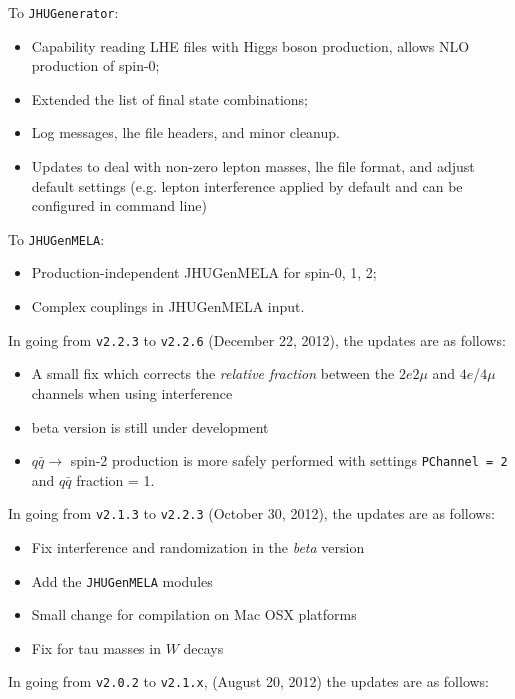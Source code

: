 \documentclass[aps,superscriptaddress,nofootinbib]{revtex4}
\begin{document}
To \verb|JHUGenerator|:
\begin{itemize}
\item Capability reading LHE files with Higgs boson production, allows NLO production of spin-0;
\item Extended the list of final state combinations;
\item Log messages, lhe file headers, and minor cleanup.
\item Updates to deal with non-zero lepton masses, lhe file format, and adjust default settings (e.g. lepton interference applied by default and can be configured in command line)
\end{itemize}

To \verb|JHUGenMELA|:
\begin{itemize}
\item Production-independent JHUGenMELA for spin-0, 1, 2;
\item Complex couplings in JHUGenMELA input.
\end{itemize}

\noindent
In going from \verb|v2.2.3| to \verb|v2.2.6| (December 22, 2012), the updates are as follows:
\begin{itemize}
\item A small fix which corrects the {\it relative fraction} between the $2e2\mu$ and $4e$/$4\mu$ channels when using interference
\item beta version is still under development
\item $q\bar{q} \to$ spin-2 production is more safely performed with settings \verb|PChannel = 2| and $q\bar{q}$ fraction = 1.
\end{itemize}

\noindent
In going from \verb|v2.1.3| to \verb|v2.2.3| (October 30, 2012), the updates are as follows:
\begin{itemize}
\item Fix interference and randomization in the {\it{beta}} version
\item Add the \verb|JHUGenMELA| modules
\item Small change for compilation on Mac OSX platforms
\item Fix for tau masses in $W$ decays
\end{itemize}

\noindent
In going from \verb|v2.0.2| to \verb|v2.1.x|, (August 20, 2012) the updates are as follows:
\end{document}
